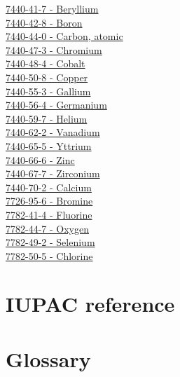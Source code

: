 \documentclass{book}
\begin{document}
\begin{multicols}{2}
\hyperref[sec:elem-beryllium]{7440-41-7 - Beryllium}\\
\hyperref[sec:elem-boron]{7440-42-8 - Boron}\\
\hyperref[sec:elem-carbon]{7440-44-0 - Carbon, atomic}\\
\hyperref[sec:elem-chromium]{7440-47-3 - Chromium}\\
\hyperref[sec:elem-cobalt]{7440-48-4 - Cobalt}\\
\hyperref[sec:elem-copper]{7440-50-8 - Copper}\\
\hyperref[sec:elem-gallium]{7440-55-3 - Gallium}\\
\hyperref[sec:elem-germanium]{7440-56-4 - Germanium}\\
\hyperref[sec:elem-helium]{7440-59-7 - Helium}\\
\hyperref[sec:elem-vanadium]{7440-62-2 - Vanadium}\\
\hyperref[sec:elem-yttrium]{7440-65-5 - Yttrium}\\
\hyperref[sec:elem-zinc]{7440-66-6 - Zinc}\\
\hyperref[sec:elem-zirconium]{7440-67-7 - Zirconium}\\
\hyperref[sec:elem-calcium]{7440-70-2 - Calcium}\\
\hyperref[sec:elem-bromine]{7726-95-6 - Bromine}\\
\hyperref[sec:elem-fluorine]{7782-41-4 - Fluorine}\\
\hyperref[sec:elem-oxygen]{7782-44-7 - Oxygen}\\
\hyperref[sec:elem-selenium]{7782-49-2 - Selenium}\\
\hyperref[sec:elem-chlorine]{7782-50-5 - Chlorine}\\
\end{multicols}

\chapter{IUPAC reference}

\chapter{Glossary}
\end{document}
